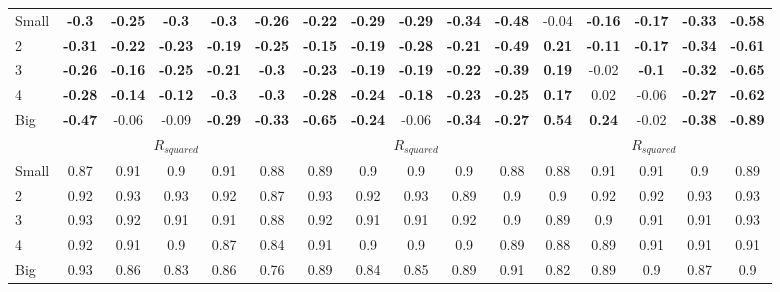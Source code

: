 \begin{table}[H]
\begin{tabular}{lccccc|ccccc|ccccc}
Small & \textbf{-0.3} & \textbf{-0.25} & \textbf{-0.3} & \textbf{-0.3} & \textbf{-0.26} & \textbf{-0.22} & \textbf{-0.29} & \textbf{-0.29} & \textbf{-0.34} & \textbf{-0.48} & -0.04 & \textbf{-0.16} & \textbf{-0.17} & \textbf{-0.33} & \textbf{-0.58} \\
2 & \textbf{-0.31} & \textbf{-0.22} & \textbf{-0.23} & \textbf{-0.19} & \textbf{-0.25} & \textbf{-0.15} & \textbf{-0.19} & \textbf{-0.28} & \textbf{-0.21} & \textbf{-0.49} & \textbf{0.21} & \textbf{-0.11} & \textbf{-0.17} & \textbf{-0.34} & \textbf{-0.61} \\
3 & \textbf{-0.26} & \textbf{-0.16} & \textbf{-0.25} & \textbf{-0.21} & \textbf{-0.3} & \textbf{-0.23} & \textbf{-0.19} & \textbf{-0.19} & \textbf{-0.22} & \textbf{-0.39} & \textbf{0.19} & -0.02 & \textbf{-0.1} & \textbf{-0.32} & \textbf{-0.65} \\
4 & \textbf{-0.28} & \textbf{-0.14} & \textbf{-0.12} & \textbf{-0.3} & \textbf{-0.3} & \textbf{-0.28} & \textbf{-0.24} & \textbf{-0.18} & \textbf{-0.23} & \textbf{-0.25} & \textbf{0.17} & 0.02 & -0.06 & \textbf{-0.27} & \textbf{-0.62} \\
Big & \textbf{-0.47} & -0.06 & -0.09 & \textbf{-0.29} & \textbf{-0.33} & \textbf{-0.65} & \textbf{-0.24} & -0.06 & \textbf{-0.34} & \textbf{-0.27} & \textbf{0.54} & \textbf{0.24} & -0.02 & \textbf{-0.38} & \textbf{-0.89} \\
 & \multicolumn{5}{c|}{$R_{squared}$} & \multicolumn{5}{c|}{$R_{squared}$} & \multicolumn{5}{c}{$R_{squared}$} \\
Small & 0.87 & 0.91 & 0.9 & 0.91 & 0.88 & 0.89 & 0.9 & 0.9 & 0.9 & 0.88 & 0.88 & 0.91 & 0.91 & 0.9 & 0.89 \\
2 & 0.92 & 0.93 & 0.93 & 0.92 & 0.87 & 0.93 & 0.92 & 0.93 & 0.89 & 0.9 & 0.9 & 0.92 & 0.92 & 0.93 & 0.93 \\
3 & 0.93 & 0.92 & 0.91 & 0.91 & 0.88 & 0.92 & 0.91 & 0.91 & 0.92 & 0.9 & 0.89 & 0.9 & 0.91 & 0.91 & 0.93 \\
4 & 0.92 & 0.91 & 0.9 & 0.87 & 0.84 & 0.91 & 0.9 & 0.9 & 0.9 & 0.89 & 0.88 & 0.89 & 0.91 & 0.91 & 0.91 \\
Big & 0.93 & 0.86 & 0.83 & 0.86 & 0.76 & 0.89 & 0.84 & 0.85 & 0.89 & 0.91 & 0.82 & 0.89 & 0.9 & 0.87 & 0.9 \\
\end{tabular}
\end{table}
